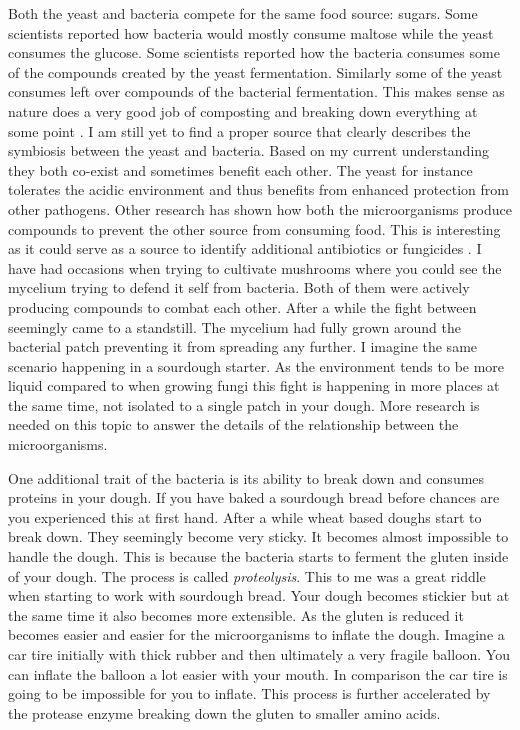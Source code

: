 Both the yeast and bacteria compete for the same food source: sugars.
Some scientists reported how bacteria would mostly consume maltose
while the yeast consumes the glucose. Some scientists reported
how the bacteria consumes some of the compounds created by the
yeast fermentation. Similarly some of the yeast consumes left
over compounds of the bacterial fermentation. This makes sense
as nature does a very good job of composting and breaking down
everything at some point \cite{lactobacillus+sanfrancisco}.
I am still yet to find
a proper source that clearly describes the symbiosis between
the yeast and bacteria. Based on my current understanding
they both co-exist and sometimes benefit each other. The yeast
for instance tolerates the acidic environment and thus benefits
from enhanced protection from other pathogens. Other research
has shown how both the microorganisms produce compounds
to prevent the other source from consuming food. This is interesting
as it could serve as a source to identify additional antibiotics
or fungicides \cite{mold+lactic+acid+bacteria}. I have had
occasions when trying to cultivate mushrooms where you could
see the mycelium trying to defend it self from bacteria. Both
of them were actively producing compounds to combat each other.
After a while the fight between seemingly came to a standstill.
The mycelium had fully grown around the bacterial patch preventing
it from spreading any further. I imagine the same scenario happening
in a sourdough starter. As the environment tends to be more liquid
compared to when growing fungi this fight is happening in more places
at the same time, not isolated to a single patch in your dough.
More research is needed on this topic to answer the details of the
relationship between the microorganisms.

One additional trait of the bacteria is its ability to break down
and consumes proteins in your dough. If you have baked a sourdough
bread before chances are you experienced this at first hand. After
a while wheat based doughs start to break down. They seemingly become
very sticky. It becomes almost impossible to handle the dough. This
is because the bacteria starts to ferment the gluten inside of your dough.
The process is called \emph{proteolysis}. This to me was a great riddle
when starting to work with sourdough bread. Your dough becomes stickier
but at the same time it also becomes more extensible. As the gluten
is reduced it becomes easier and easier for the microorganisms to inflate the
dough. Imagine a car tire initially with thick rubber and then ultimately
a very fragile balloon. You can inflate the balloon a lot easier with your
mouth. In comparison the car tire is going to be impossible for you
to inflate. This process is further accelerated by the protease
enzyme breaking down the gluten to smaller amino acids.

